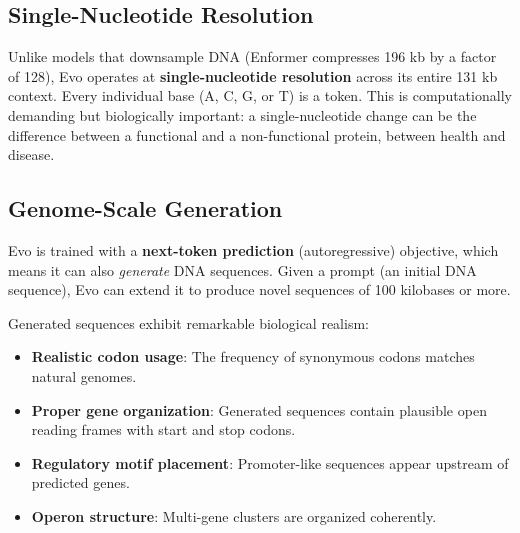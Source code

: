 \subsection{Single-Nucleotide Resolution}

Unlike models that downsample DNA (Enformer compresses 196 kb by a factor of 128), Evo operates at \textbf{single-nucleotide resolution} across its entire 131 kb context. Every individual base (A, C, G, or T) is a token. This is computationally demanding but biologically important: a single-nucleotide change can be the difference between a functional and a non-functional protein, between health and disease.

\subsection{Genome-Scale Generation}

Evo is trained with a \textbf{next-token prediction} (autoregressive) objective, which means it can also \emph{generate} DNA sequences. Given a prompt (an initial DNA sequence), Evo can extend it to produce novel sequences of 100 kilobases or more.

Generated sequences exhibit remarkable biological realism:
\begin{itemize}[leftmargin=1.5em]
  \item \textbf{Realistic codon usage}: The frequency of synonymous codons matches natural genomes.
  \item \textbf{Proper gene organization}: Generated sequences contain plausible open reading frames with start and stop codons.
  \item \textbf{Regulatory motif placement}: Promoter-like sequences appear upstream of predicted genes.
  \item \textbf{Operon structure}: Multi-gene clusters are organized coherently.
\end{itemize}

